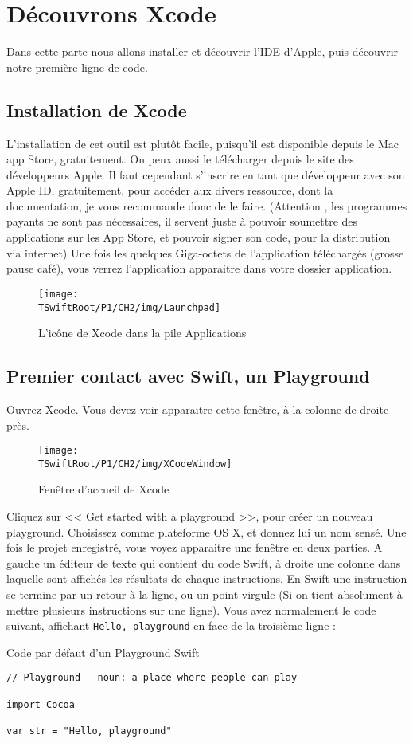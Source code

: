 \chapter{Découvrons Xcode}
Dans cette parte nous allons installer et découvrir l'IDE d’Apple, puis découvrir notre
première ligne de code.
\section{Installation de Xcode}
L'installation de cet outil est plutôt facile, puisqu’il est disponible depuis le Mac app Store,
gratuitement. On peux aussi le télécharger depuis le site des développeurs Apple. Il faut
cependant s'inscrire en tant que développeur avec son Apple ID, gratuitement, pour
accéder aux divers ressource, dont la documentation, je vous recommande donc de le
faire.
(Attention , les programmes payants ne sont pas nécessaires, il servent juste à pouvoir
soumettre des applications sur les App Store, et pouvoir signer son code, pour la
distribution via internet)
Une fois les quelques Giga-octets de l'application téléchargés (grosse pause café), vous
verrez l'application apparaitre dans votre dossier application.
\begin{figure}[h]
\centering
\texttt{[image: \\TSwiftRoot/P1/CH2/img/Launchpad]}
\caption{L'icône de Xcode dans la pile Applications}
\end{figure}

\section{Premier contact avec Swift, un Playground}
Ouvrez Xcode. Vous devez voir apparaitre cette fenêtre, à la colonne de droite près.
\begin{figure}[h]
\centering
\texttt{[image: \\TSwiftRoot/P1/CH2/img/XCodeWindow]}
\caption{Fenêtre d'accueil de Xcode}
\end{figure}

Cliquez sur << Get started with a playground >>, pour créer un nouveau playground.
Choisissez comme plateforme OS X, et donnez lui un nom sensé.
Une fois le projet enregistré, vous voyez apparaitre une fenêtre en deux parties.
A gauche un éditeur de texte qui contient du code Swift, à droite une colonne dans
laquelle sont affichés les résultats de chaque instructions.
En Swift une instruction se termine par un retour à la ligne, ou un point virgule (Si on tient
absolument à mettre plusieurs instructions sur une ligne).
Vous avez normalement le code suivant, affichant \verb"Hello, playground" en face de la troisième ligne :
\begin{listing}[h]
\caption{Code par défaut d'un Playground Swift}
\begin{verbatim}
// Playground - noun: a place where people can play

import Cocoa

var str = "Hello, playground"
\end{verbatim}
\end{listing}

